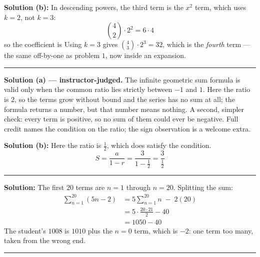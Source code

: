 \documentclass[12pt]{article}
\begin{document}
\textbf{Solution (b):} In descending powers, the third term is the $x^2$ term, which uses
$k = 2$, not $k = 3$:
\[ \binom{4}{2} \cdot 2^2 = 6 \cdot 4 \]
so the coefficient is 
Using $k = 3$ gives $\binom{4}{3} \cdot 2^3 = 32$, which is the \emph{fourth} term --- the
same off-by-one as problem $1$, now inside an expansion.

\vspace{0.2cm}\noindent\rule{\linewidth}{0.2pt}


\vspace{0.05cm}
\textbf{Solution (a) --- instructor-judged.} The infinite geometric sum formula is valid
only when the common ratio lies strictly between $-1$ and $1$. Here the ratio is $2$, so the
terms grow without bound and the series has no sum at all; the formula returns a number, but
that number means nothing. A second, simpler check: every term is positive, so no sum of
them could ever be negative. Full credit names the condition on the ratio; the sign
observation is a welcome extra.

\vspace{0.15cm}
\textbf{Solution (b):} Here the ratio is $\tfrac{1}{2}$, which does satisfy the condition.
\[ S = \frac{a}{1 - r} = \frac{3}{1 - \tfrac{1}{2}} = \frac{3}{\tfrac{1}{2}} \]

\vspace{0.2cm}\noindent\rule{\linewidth}{0.2pt}


\textbf{Solution:} The first $20$ terms are $n = 1$ through $n = 20$. Splitting the sum:
\begin{align*}
  \sum_{n=1}^{20} (5n - 2) &= 5\sum_{n=1}^{20} n \; - \; 2(20) \\
                           &= 5 \cdot \frac{20 \cdot 21}{2} - 40 \\
                           &= 1050 - 40
\end{align*}
The student's $1008$ is $1010$ plus the $n = 0$ term, which is $-2$: one term too many, taken
from the wrong end.

\vspace{0.2cm}\noindent\rule{\linewidth}{0.2pt}

\end{document}
